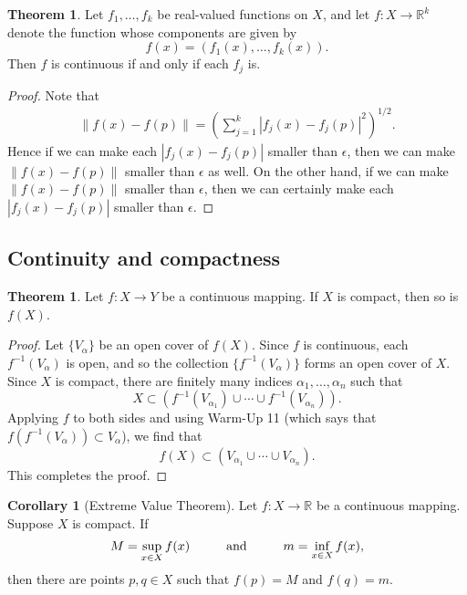 \documentclass[12pt]{article}
\newcommand{\norm}[1]{\left\lVert#1\right\rVert}
\theoremstyle{definition}
\theoremstyle{theorem}
\newtheorem{theorem}[definition]{Theorem}
\newtheorem{corollary}[definition]{Corollary}
\begin{document}
\begin{theorem}
Let $f_1, \ldots, f_k$ be real-valued functions on $X$, and let $f : X \to \mathbb{R}^k$ denote the function whose components are given by 
\[
f(x) = (f_1(x), \ldots, f_k(x)).
\]
Then $f$ is continuous if and only if each $f_j$ is. 
\end{theorem}

\begin{proof}
Note that 
\begin{align*}
\norm{f(x) - f(p)} = \left(\sum_{j=1}^k |f_j(x) - f_j(p)|^2\right)^{1/2}.
\end{align*}
Hence if we can make each $|f_j(x) - f_j(p)|$ smaller than $\epsilon$, then we can make $\norm{f(x) - f(p)}$ smaller than $\epsilon$ as well. On the other hand, if we can make $\norm{f(x) - f(p)}$ smaller than $\epsilon$, then we can certainly make each $|f_j(x) - f_j(p)|$ smaller than $\epsilon.$
\end{proof}

\subsection{Continuity and compactness}

\begin{theorem}
Let $f : X \to Y$ be a continuous mapping. If $X$ is compact, then so is $f(X)$. 
\end{theorem}

\begin{proof}
Let $\{V_\alpha\}$ be an open cover of $f(X)$. Since $f$ is continuous, each $f^{-1}(V_\alpha)$ is open, and so the collection $\{f^{-1}(V_\alpha)\}$ forms an open cover of $X$. Since $X$ is compact, there are finitely many indices $\alpha_1, \ldots, \alpha_n$ such that 
\[
X \subset (f^{-1}(V_{\alpha_1}) \cup \cdots \cup f^{-1}(V_{\alpha_n})).
\]
Applying $f$ to both sides and using Warm-Up 11 (which says that $f(f^{-1}(V_\alpha)) \subset V_\alpha$), we find that 
\[
f(X) \subset (V_{\alpha_1} \cup \cdots \cup V_{\alpha_n}). 
\]
This completes the proof. 
\end{proof}

\begin{corollary}[Extreme Value Theorem]
Let $f : X \to \mathbb{R}$ be a continuous mapping. Suppose $X$ is compact. If 
\[
M = \sup_{x \in X} f(x) \hspace{10mm} \text{and} \hspace{10mm} m = \inf_{x \in X} f(x),
\]
then there are points $p,q \in X$ such that $f(p) = M$ and $f(q) = m$. 
\end{corollary}
\end{document}
